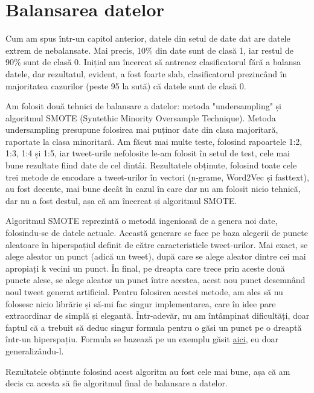 \chapter{Balansarea datelor}

Cum am spus într-un capitol anterior, datele din setul de date dat are datele extrem de nebalansate. Mai
precis, 10\% din date sunt de clasă 1, iar restul de 90\% sunt de clasă 0. Inițial am încercat să antrenez
clasificatorul fără a balansa datele, dar rezultatul, evident, a fost foarte slab, clasificatorul prezincând
în majoritatea cazurilor (peste 95 la sută) că datele sunt de clasă 0.

Am folosit două tehnici de balansare a datelor: metoda "undersampling" și algoritmul SMOTE (Syntethic Minority Oversample Technique).
Metoda undersampling presupune folosirea mai puținor date din clasa majoritară, raportate la clasa minoritară.
Am făcut mai multe teste, folosind rapoartele 1:2, 1:3, 1:4 și 1:5, iar tweet-urile nefolosite le-am folosit în setul de test,
cele mai bune rezultate fiind date de
cel dintâi. Rezultatele obținute, folosind toate cele trei metode de encodare a tweet-urilor în vectori (n-grame, Word2Vec și fasttext),
au fost decente, mai bune decât în cazul în care dar nu am folosit nicio tehnică, dar nu a fost destul, așa că
am încercat și algoritmul SMOTE.

Algoritmul SMOTE reprezintă o metodă ingenioasă de a genera noi date, folosindu-se de datele actuale. Această generare 
se face pe baza alegerii de puncte aleatoare în hiperspațiul definit de către caracteristicle tweet-urilor. 
Mai exact, se alege aleator un punct (adică un tweet), după care se alege aleator dintre cei mai apropiați k vecini
un punct. În final, pe dreapta care trece prin aceste două puncte alese, se alege aleator un punct între acestea, acest
nou punct desemnând noul tweet generat artificial. Pentru folosirea acestei metode, am ales să nu folosesc nicio librărie și
să-mi fac singur implementarea, care în idee pare extraordinar de simplă și elegantă. Într-adevăr, nu am întâmpinat dificultăți,
doar faptul că a trebuit să deduc singur formula pentru o găsi un punct pe o dreaptă într-un hiperspațiu. Formula se bazează pe
un exemplu găsit \href{http://mathcentral.uregina.ca/QQ/database/QQ.09.01/murray2.html}{aici}, eu doar generalizându-l.

Rezultatele obținute folosind acest algoritm au fost cele mai bune, așa că am decis ca acesta să fie algoritmul final de balansare
a datelor.
